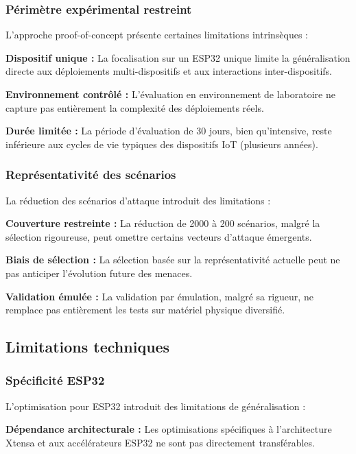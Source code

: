 \subsubsection{Périmètre expérimental restreint}

L'approche proof-of-concept présente certaines limitations intrinsèques :

\textbf{Dispositif unique :} La focalisation sur un ESP32 unique limite la généralisation directe aux déploiements multi-dispositifs et aux interactions inter-dispositifs.

\textbf{Environnement contrôlé :} L'évaluation en environnement de laboratoire ne capture pas entièrement la complexité des déploiements réels.

\textbf{Durée limitée :} La période d'évaluation de 30 jours, bien qu'intensive, reste inférieure aux cycles de vie typiques des dispositifs IoT (plusieurs années).

\subsubsection{Représentativité des scénarios}

La réduction des scénarios d'attaque introduit des limitations :

\textbf{Couverture restreinte :} La réduction de 2000 à 200 scénarios, malgré la sélection rigoureuse, peut omettre certains vecteurs d'attaque émergents.

\textbf{Biais de sélection :} La sélection basée sur la représentativité actuelle peut ne pas anticiper l'évolution future des menaces.

\textbf{Validation émulée :} La validation par émulation, malgré sa rigueur, ne remplace pas entièrement les tests sur matériel physique diversifié.

\subsection{Limitations techniques}

\subsubsection{Spécificité ESP32}

L'optimisation pour ESP32 introduit des limitations de généralisation :

\textbf{Dépendance architecturale :} Les optimisations spécifiques à l'architecture Xtensa et aux accélérateurs ESP32 ne sont pas directement transférables.

